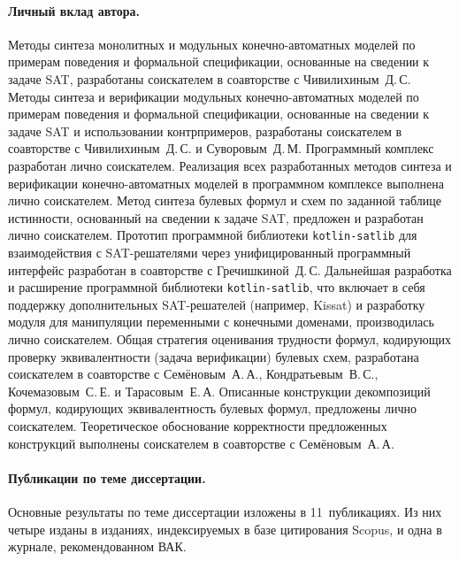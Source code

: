 \paragraph{Личный вклад автора.}
%
Методы синтеза монолитных и модульных конечно-автоматных моделей по примерам поведения и формальной спецификации, основанные на сведении к задаче SAT, разработаны соискателем в соавторстве с Чивилихиным~Д.\,С.
Методы синтеза и верификации модульных конечно-автоматных моделей по примерам поведения и формальной спецификации, основанные на сведении к задаче SAT и использовании контрпримеров, разработаны соискателем в соавторстве с Чивилихиным~Д.\,С. и Суворовым~Д.\,М.
Программный комплекс  разработан лично соискателем.
Реализация всех разработанных методов синтеза и верификации конечно-автоматных моделей в программном комплексе  выполнена лично соискателем.
Метод синтеза булевых формул и схем по заданной таблице истинности, основанный на сведении к задаче SAT, предложен и разработан лично соискателем.
Прототип программной библиотеки \texttt{kotlin-satlib} для взаимодействия с SAT-решателями через унифицированный программный интерфейс разработан в соавторстве с Гречишкиной~Д.\,С.
Дальнейшая разработка и расширение программной библиотеки \texttt{kotlin-satlib}, что включает в себя поддержку дополнительных SAT-решателей (например, Kissat) и разработку модуля для манипуляции переменными с конечными доменами, производилась лично соискателем.
Общая стратегия оценивания трудности формул, кодирующих проверку эквивалентности (задача верификации) булевых схем, разработана соискателем в соавторстве с Семёновым~А.\,А., Кондратьевым~В.\,С., Кочемазовым~С.\,Е. и Тарасовым~Е.\,А.
Описанные конструкции декомпозиций формул, кодирующих эквивалентность булевых формул, предложены лично соискателем.
Теоретическое обоснование корректности предложенных конструкций выполнены соискателем в соавторстве с Семёновым~А.\,А.


%
%
\paragraph{Публикации по теме диссертации.}
%
%
Основные результаты по теме диссертации изложены в 11~публикациях.
Из них четыре изданы в изданиях, индексируемых в базе цитирования Scopus, и одна в журнале, рекомендованном ВАК.


\ifsynopsis
\else
%
%
